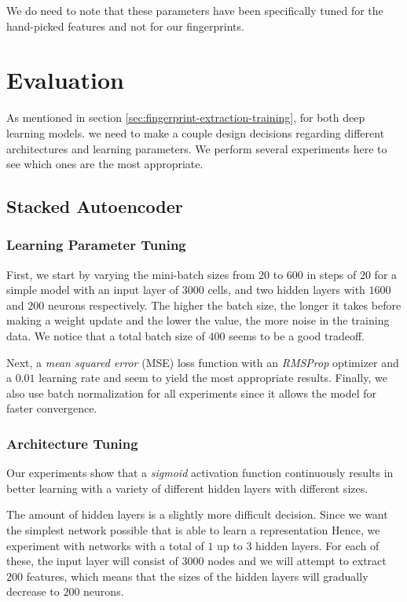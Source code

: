 We do need to note that these parameters have been specifically tuned for the hand-picked features and not for our fingerprints.

\section{Evaluation}
As mentioned in section \ref{sec:fingerprint-extraction-training}, for both deep learning models. we need to make a couple design decisions regarding different architectures and learning parameters.
We perform several experiments here to see which ones are the most appropriate.

\subsection{Stacked Autoencoder}

\subsubsection{Learning Parameter Tuning}

First, we start by varying the mini-batch sizes from $20$ to $600$ in steps of $20$ for a simple model with an input layer of $3000$ cells, and two hidden layers with $1600$ and $200$ neurons respectively.
The higher the batch size, the longer it takes before making a weight update and the lower the value, the more noise in the training data.
We notice that a total batch size of $400$ seems to be a good tradeoff.

Next, a \textit{mean squared error} (MSE) loss function with an \textit{RMSProp} optimizer and a $0.01$ learning rate and seem to yield the most appropriate results.
Finally, we also use batch normalization for all experiments since it allows the model for faster convergence.

\subsubsection{Architecture Tuning}

Our experiments show that a \textit{sigmoid} activation function continuously results in better learning with a variety of different hidden layers with different sizes.

The amount of hidden layers is a slightly more difficult decision.
Since we want the simplest network possible that is able to learn a representation
Hence, we experiment with networks with a total of $1$ up to $3$ hidden layers.
For each of these, the input layer will consist of $3000$ nodes and we will attempt to extract $200$ features, which means that the sizes of the hidden layers will gradually decrease to $200$ neurons.


